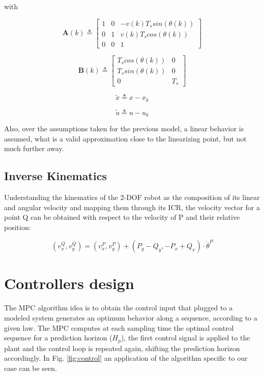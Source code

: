 \documentclass[conference]{IEEEtran}
\begin{document}
with

\begin{equation*} 
\mathbf{A}(k) \triangleq
\left[\begin{array}{ccc}
1 & 0 & -v(k)T_{s}sin(\theta(k)) \\
0 & 1 & v(k)T_{s}cos(\theta(k)) \\ 
0 & 0 & 1 \end{array}\right]
\end{equation*}

\begin{equation*} 
\mathbf{B}(k) \triangleq
\left[\begin{array}{cc}
T_{s}cos(\theta(k)) & 0 \\
T_{s}sin(\theta(k)) & 0  \\ 
0 & T_{s} \end{array}\right]
\end{equation*}

\begin{equation*}
\tilde{x} \triangleq x-x_{k}
\end{equation*}

\begin{equation*} 
\tilde{u} \triangleq u-u_{k}
\end{equation*}

Also, over the assumptions taken  for the previous model, a linear behavior is assumed, what is a valid approximation close to the linearizing point, but not much further away.

\subsection{Inverse Kinematics}\label{AC}

Understanding the kinematics of the 2-DOF robot as the composition of its linear and angular velocity and mapping them through its ICR, the velocity vector for a point Q can be obtained with respect to the velocity of P and their relative position:

\begin{equation} \label{eq:4}
(v_{x}^{Q},v_{y}^{Q})=(v_{x}^{P},v_{y}^{P})+(P_{y}-Q_{y},-P_{x}+Q_{x})\cdotp\dot{\theta}^{P}
\end{equation}

\section{Controllers design}

The MPC algorithm idea is to obtain the control input that plugged to a modeled system generates an optimum behavior along a sequence, according to a given law. The MPC computes at each sampling time the optimal control sequence for a prediction horizon ($H_{p}$), the first control signal is applied to the plant and the control loop is repeated again, shifting the prediction horizon accordingly. In Fig. \ref{fig:control} an application of the algorithm specific to our case can be seen.
\end{document}
